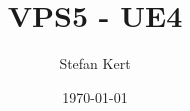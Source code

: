 \documentclass[a4paper,ngerman]{scrartcl}
\begin{document}
\title{VPS5 - UE4}
\author{Stefan Kert}
\date{\today}
\maketitle
\end{document}
